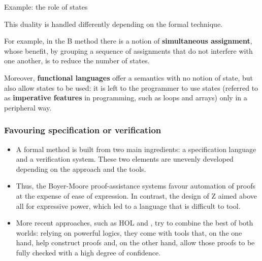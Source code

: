 \documentclass[compress,dvipdfmx]{beamer}
\begin{document}
%
\begin{frame}{Example: the role of states}

  This duality is handled differently depending on the formal
  technique.

  \bigskip

  For example, in the \textsf{B} method there is a notion of
  \textbf{simultaneous assignment}, whose benefit, by grouping a
  sequence of assignments that do not interfere with one another, is
  to reduce the number of states.

  \bigskip

  Moreover, \textbf{functional languages} offer a semantics with no
  notion of state, but also allow states to be used: it is left to the
  programmer to use states (referred to as \textbf{imperative
    features} in programming, such as loops and arrays) only in a
  peripheral way.

\end{frame}

%
\begin{frame}
\frametitle{Favouring specification or verification}
\begin{itemize}

  \item A formal method is built from two main ingredients: a
  specification language and a verification system. These two
  elements are unevenly developed depending on the approach and the
  tools.

  \item Thus, the Boyer-Moore proof-assistance systems favour
  automation of proofs at the expense of ease of expression. In
  contrast, the design of \textsf{Z} aimed above all for expressive
  power, which led to a language that is difficult to tool.

  \item More recent approaches, such as \textsf{HOL} and
  \Coq, try to combine the best of both worlds: relying on
  powerful logics, they come with tools that, on the one hand, help
  construct proofs and, on the other hand, allow those proofs to be
  fully checked with a high degree of confidence.

\end{itemize}

\end{frame}
\end{document}
